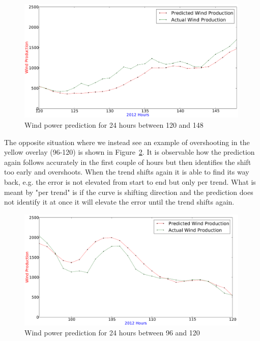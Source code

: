 \begin{figure}[ht!]
\centering
\includegraphics[width=0.99\textwidth]{billeder/bestInputCombi120-148.png}
\caption{Wind power prediction for 24 hours between 120 and 148}
\label{fig:bestInputCombi120-148}
\end{figure} 

The opposite situation where we instead see an example of overshooting in the yellow overlay (96-120) is shown in Figure~\ref{fig:bestInputCombi96-120}. It is observable how the prediction again follows accurately in the first couple of hours but then identifies the shift too early and overshoots. When the trend shifts again it is able to find its way back, e.g. the error is not elevated from start to end but only per trend. What is meant by "per trend" is if the curve is shifting direction and the prediction does not identify it at once it will elevate the error until the trend shifts again. 

\begin{figure}[ht!]
\centering
\includegraphics[width=0.99\textwidth]{billeder/bestInputCombi96-120.png}
\caption{Wind power prediction for 24 hours between 96 and 120}
\label{fig:bestInputCombi96-120}
\end{figure} 

